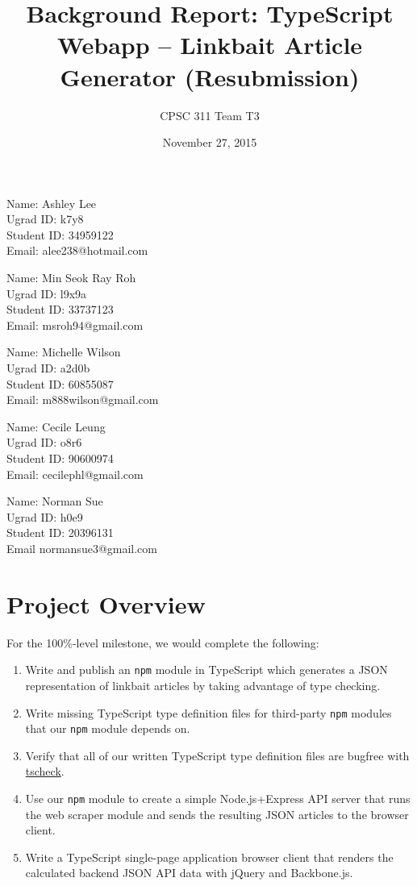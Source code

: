 \documentclass[]{article}
\title{Background Report: TypeScript Webapp -- Linkbait Article Generator (Resubmission)}
\author{CPSC 311 Team T3}
\date{November 27, 2015}
\begin{document}
\maketitle

Name: Ashley Lee\\Ugrad ID: k7y8\\Student ID: 34959122\\Email:
alee238@hotmail.com

Name: Min Seok Ray Roh\\Ugrad ID: l9x9a\\Student ID: 33737123\\Email:
msroh94@gmail.com

Name: Michelle Wilson\\Ugrad ID: a2d0b\\Student ID: 60855087\\Email:
m888wilson@gmail.com

Name: Cecile Leung\\Ugrad ID: o8r6\\Student ID: 90600974\\Email:
cecilephl@gmail.com

Name: Norman Sue\\Ugrad ID: h0e9\\Student ID: 20396131\\Email
normansue3@gmail.com

\section{Project Overview}\label{project-overview}

For the 100\%-level milestone, we would complete the following:

\begin{enumerate}
\def\labelenumi{\arabic{enumi}.}
\itemsep1pt\parskip0pt
\item
  Write and publish an \texttt{npm} module in TypeScript which generates
  a JSON representation of linkbait articles by taking advantage of type
  checking.
\item
  Write missing TypeScript type definition files for third-party
  \texttt{npm} modules that our \texttt{npm} module depends on.
\item
  Verify that all of our written TypeScript type definition files are
  bugfree with
  \href{https://github.com/asgerf/tscheck}{tscheck}.\cite{ref1}
\item
  Use our \texttt{npm} module to create a simple Node.js+Express API
  server that runs the web scraper module and sends the resulting JSON
  articles to the browser client.
\item
  Write a TypeScript single-page application browser client that renders
  the calculated backend JSON API data with jQuery and Backbone.js.
\end{enumerate}
\end{document}
